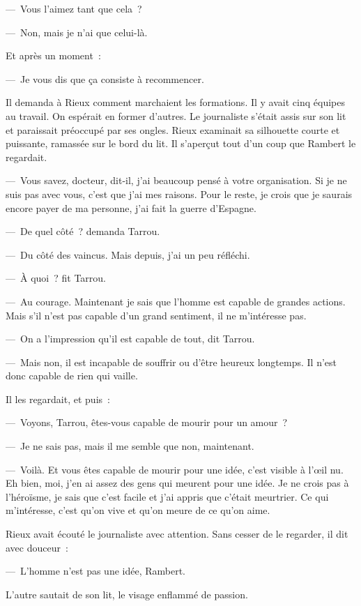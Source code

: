 \documentclass[french,twoside]{book} %
\begin{document}
— Vous l’aimez tant que cela ?\par
— Non, mais je n’ai que celui-là.\par
Et après un moment :\par
— Je vous dis que ça consiste à recommencer.\par
Il demanda à Rieux comment marchaient les formations. Il y avait cinq équipes au travail. On espérait en former d’autres. Le journaliste s’était assis sur son lit et paraissait préoccupé par ses ongles. Rieux examinait sa silhouette courte et puissante, ramassée sur le bord du lit. Il s’aperçut tout d’un coup que Rambert le regardait.\par
— Vous savez, docteur, dit-il, j’ai beaucoup pensé à votre organisation. Si je ne suis pas avec vous, c’est que j’ai mes raisons. Pour le reste, je crois que je saurais encore payer de ma personne, j’ai fait la guerre d’Espagne.\par
— De quel côté ? demanda Tarrou.\par
— Du côté des vaincus. Mais depuis, j’ai un peu réfléchi.\par
— À quoi ? fit Tarrou.\par
— Au courage. Maintenant je sais que l’homme est capable de grandes actions. Mais s’il n’est pas capable d’un grand sentiment, il ne m’intéresse pas.\par
— On a l’impression qu’il est capable de tout, dit Tarrou.\par
— Mais non, il est incapable de souffrir ou d’être heureux longtemps. Il n’est donc capable de rien qui vaille.\par
Il les regardait, et puis :\par
— Voyons, Tarrou, êtes-vous capable de mourir pour un amour ?\par
— Je ne sais pas, mais il me semble que non, maintenant.\par
— Voilà. Et vous êtes capable de mourir pour une idée, c’est visible à l’œil nu. Eh bien, moi, j’en ai assez des gens qui meurent pour une idée. Je ne crois pas à l’héroïsme, je sais que c’est facile et j’ai appris que c’était meurtrier. Ce qui m’intéresse, c’est qu’on vive et qu’on meure de ce qu’on aime.\par
Rieux avait écouté le journaliste avec attention. Sans cesser de le regarder, il dit avec douceur :\par
— L’homme n’est pas une idée, Rambert.\par
L’autre sautait de son lit, le visage enflammé de passion.\par
\end{document}
